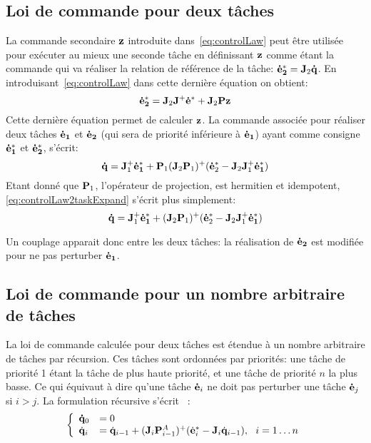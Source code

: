 \subsection{Loi de commande pour deux t\^aches}
La commande secondaire ${\mathbf{z}}$ introduite dans~\eqref{eq:controlLaw} peut
être utilisée pour exécuter au mieux une seconde t\^ache en définissant ${\mathbf{z}}$
comme étant la commande qui va réaliser la relation de référence de la t\^ache: ${\mathbf{\dot{e}_2^*}} = {\mathbf{J}}_2 {\mathbf{\dot{q}}}$.
En introduisant~\eqref{eq:controlLaw} dans cette dernière équation on obtient:
\begin{equation}
  \mbf{\dot{e}_2^*} = \mbf{J}_2 \mbf{J}^+ \mbf{\dot{e}^*} + \mbf{J}_2 \mbf{P}\mbf{z}
  \label{eq:zCompute}
\end{equation}
Cette dernière équation permet de calculer ${\mathbf{z}}$.
La commande associée pour réaliser deux t\^aches ${\mathbf{\dot{e}_1}}$ et ${\mathbf{\dot{e}_2}}$ (qui sera
de priorité inférieure à ${\mathbf{\dot{e}_1}}$) ayant
comme consigne ${\mathbf{\dot{e}_1^*}}$ et ${\mathbf{\dot{e}_2^*}}$, s'écrit:
\begin{equation}
  \mbf{\dot{q}} = \mbf{J}_1^+ \mbf{\dot{e}_1^*} + \mbf{P}_1 (\mbf{J}_2 \mbf{P}_1)^+(\mbf{\dot{e}}_ 2^* - \mbf{J}_2\mbf{J}_1^+ \mbf{\dot{e}_1^*})
  \label{eq:controlLaw2taskExpand}
\end{equation}
Etant donné que ${\mathbf{P}}_1$, l'opérateur de projection, est hermitien et idempotent, 
\eqref{eq:controlLaw2taskExpand} s'écrit plus simplement:
\begin{equation}
  \mbf{\dot{q}} = \mbf{J}_1^+ \mbf{\dot{e}_1^*} + (\mbf{J}_2 \mbf{P}_1)^+(\mbf{\dot{e}}_ 2^* - \mbf{J}_2\mbf{J}_1^+ \mbf{\dot{e}_1^*})
  \label{eq:controlLaw2taskSimple}
\end{equation}

Un couplage apparait donc entre les deux t\^aches: la réalisation de ${\mathbf{\dot{e}_2}}$ 
est modifiée pour ne pas perturber ${\mathbf{\dot{e}_1}}$.

\subsection{Loi de commande pour un nombre arbitraire de t\^aches}
La loi de commande calculée pour deux t\^aches est étendue à un nombre arbitraire de t\^aches
par récursion. Ces t\^aches sont ordonnées par priorités: une t\^ache
de priorité 1 étant la t\^ache de plus haute priorité, et une t\^ache de priorité $n$ la plus basse.
Ce qui équivaut à dire qu'une t\^ache ${\mathbf{\dot{e}}}_i$ ne doit pas perturber une
t\^ache ${\mathbf{\dot{e}}}_j$ si $i>j$. La formulation récursive
s'écrit~\cite{siciliano91} :
\begin{equation}
  \left\{
  \begin{array}{ll}
  \mbf{\dot{q}}_0 &= 0\\
  \dot{\mbf{q}}_i &= \dot{\mbf{q}}_{i-1} + (\mbf{J}_i \mbf{P}_{i-1}^{A})^+
(\dot{\mbf{e}}^*_i - \mbf{J}_i \dot{\mbf{q}}_{i-1}) , \ \ i = 1 \ldots n
\end{array}
  \right.
  \label{eq:controlLawNtask}
\end{equation}

